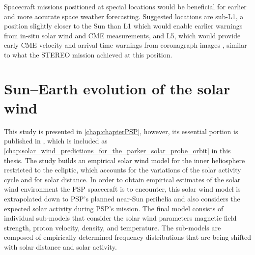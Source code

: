 Spacecraft missions positioned at special locations would be beneficial for earlier and more accurate space weather forecasting. Suggested locations are sub-L1, a position slightly closer to the Sun than L1 which would enable earlier warnings from in-situ solar wind and CME measurements, and L5, which would provide early CME velocity and arrival time warnings from coronagraph images \citep{Vourlidas2015}, similar to what the STEREO mission achieved at this position.


\clearpage


\section{Sun--Earth evolution of the solar wind}
This study is presented in \autoref{chap:chapterPSP}, however, its essential portion is published in \citet{Venzmer2018}, which is included as \autoref{chap:solar_wind_predictions_for_the_parker_solar_probe_orbit} in this thesis.
The study builds an empirical solar wind model for the inner heliosphere restricted to the ecliptic, which accounts for the variations of the solar activity cycle and for solar distance. In order to obtain empirical estimates of the solar wind environment the PSP spacecraft is to encounter, this solar wind model is extrapolated down to PSP's planned near-Sun perihelia and also considers the expected solar activity during PSP's mission.
The final model consists of individual sub-models that consider the solar wind parameters magnetic field strength, proton velocity, density, and temperature. The sub-models are composed of empirically determined frequency distributions that are being shifted with solar distance and solar activity.

